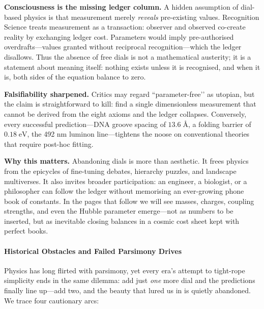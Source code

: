 \documentclass[11pt,oneside]{book}
\begin{document}
\vspace{0.5\baselineskip}
\noindent\textbf{Consciousness is the missing ledger column.}
A hidden assumption of dial-based physics is that measurement merely
\emph{reveals} pre-existing values.  Recognition Science treats measurement
as a transaction: observer and observed co-create reality by exchanging
ledger cost.  Parameters would imply pre-authorised overdrafts—values
granted without reciprocal recognition—which the ledger disallows.
Thus the absence of free dials is not a mathematical austerity; it is a
statement about meaning itself: nothing exists unless it is recognised,
and when it is, both sides of the equation balance to zero.

\vspace{0.5\baselineskip}
\noindent\textbf{Falsifiability sharpened.}
Critics may regard “parameter-free’’ as utopian, but the claim is
straightforward to kill: find a single dimensionless measurement that
cannot be derived from the eight axioms and the ledger collapses.
Conversely, every successful prediction—DNA groove spacing of
\(13.6\;\text{\AA}\), a folding barrier of \(0.18\;\text{eV}\),
the 492 nm luminon line—tightens the noose on conventional theories
that require post-hoc fitting.

\vspace{0.5\baselineskip}
\noindent\textbf{Why this matters.}
Abandoning dials is more than aesthetic.  It frees physics from the
epicycles of fine-tuning debates, hierarchy puzzles, and landscape
multiverses.  It also invites broader participation: an engineer, a
biologist, or a philosopher can follow the ledger without memorising an
ever-growing phone book of constants.  In the pages that follow we will
see masses, charges, coupling strengths, and even the Hubble parameter
emerge—not as numbers to be inserted, but as inevitable closing balances
in a cosmic cost sheet kept with perfect books.

\paragraph{Historical Obstacles and Failed Parsimony Drives}
\label{ssec:history-parsimony}

\noindent
Physics has long flirted with parsimony, yet every era’s attempt to
tight-rope simplicity ends in the same dilemma: add just \emph{one} more
dial and the predictions finally line up—add two, and the beauty that
lured us in is quietly abandoned.  We trace four cautionary arcs:
\end{document}
